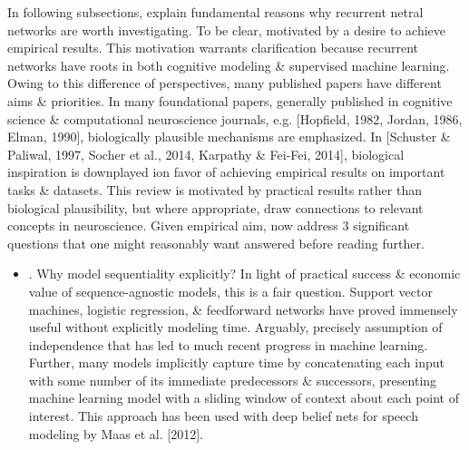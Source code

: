 \documentclass{article}
\begin{document}
\begin{enumerate}
\begin{itemize}
		In following subsections, explain fundamental reasons why recurrent netral networks are worth investigating. To be clear, motivated by a desire to achieve empirical results. This motivation warrants clarification because recurrent networks have roots in both cognitive modeling \& supervised machine learning. Owing to this difference of perspectives, many published papers have different aims \& priorities. In many foundational papers, generally published in cognitive science \& computational neuroscience journals, e.g. [Hopfield, 1982, Jordan, 1986, Elman, 1990], biologically plausible mechanisms are emphasized. In [Schuster \& Paliwal, 1997, Socher et al., 2014, Karpathy \& Fei-Fei, 2014], biological inspiration is downplayed ion favor of achieving empirical results on important tasks \& datasets. This review is motivated by practical results rather than biological plausibility, but where appropriate, draw connections to relevant concepts in neuroscience. Given empirical aim, now address 3 significant questions that one might reasonably want answered before reading further.
		\begin{itemize}
			\item {. Why model sequentiality explicitly?} In light of practical success \& economic value of sequence-agnostic models, this is a fair question. Support vector machines, logistic regression, \& feedforward networks have proved immensely useful without explicitly modeling time. Arguably, precisely assumption of independence that has led to much recent progress in machine learning. Further, many models implicitly capture time by concatenating each input with some number of its immediate predecessors \& successors, presenting machine learning model with a sliding window of context about each point of interest. This approach has been used with deep belief nets for speech modeling by Maas et al. [2012].
			

\end{itemize}
\end{itemize}
\end{enumerate}
\end{document}

